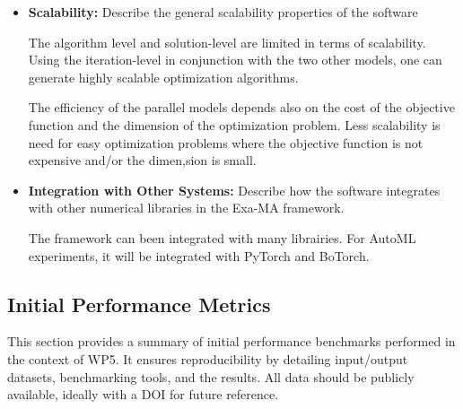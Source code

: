 \begin{itemize}
    \item \textbf{Scalability:} Describe the general scalability properties of the software

The algorithm level and solution-level are limited in terms of scalability. Using the iteration-level in conjunction with the two other models, one can generate highly scalable optimization algorithms. 

The efficiency of the parallel models depends also on the cost of the objective function and the dimension of the optimization problem. Less scalability is need for easy optimization problems where the objective function is not expensive and/or the dimen,sion is small.
    
\item \textbf{Integration with Other Systems:} Describe how the software integrates with other numerical libraries in the Exa-MA framework.

The framework can been integrated with many librairies. For AutoML experiments, it will be integrated with PyTorch and BoTorch.

\end{itemize}

\subsection{Initial Performance Metrics}
\label{sec:WP5:Zellij:metrics}

This section provides a summary of initial performance benchmarks performed in the context of WP5. It ensures reproducibility by detailing input/output datasets, benchmarking tools, and the results. All data should be publicly available, ideally with a DOI for future reference.

